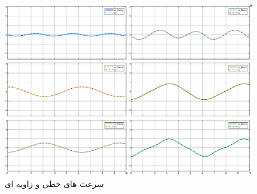 \begin{figure}[htbp]
	\centering
	\includegraphics[width=0.7\linewidth]{"../img/compare plot_after_minus"}
	\caption{سرعت های خطی و زاویه ای}
	\label{fig:plotafterminus}
\end{figure}
\FloatBarrier
